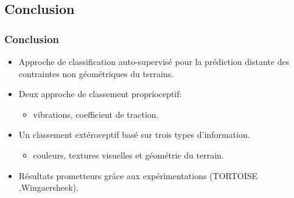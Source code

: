 \subsection{Conclusion}
    \begin{frame}
        \frametitle{Conclusion}
        \begin{itemize}
            \item Approche de classification auto-supervisé pour la prédiction distante des contraintes non géométriques du terrains.
            \item Deux approche de classement proprioceptif:
            \begin{itemize}
                \item vibrations, coefficient de traction.
            \end{itemize}
            \item Un classement extéroceptif basé sur trois types d'information.
            \begin{itemize}
                \item couleurs, textures visuelles et géométrie du terrain.
            \end{itemize}
            \item Résultats prometteurs grâce aux expérimentations (TORTOISE ,Wingaersheek).
        \end{itemize}
    \end{frame}
